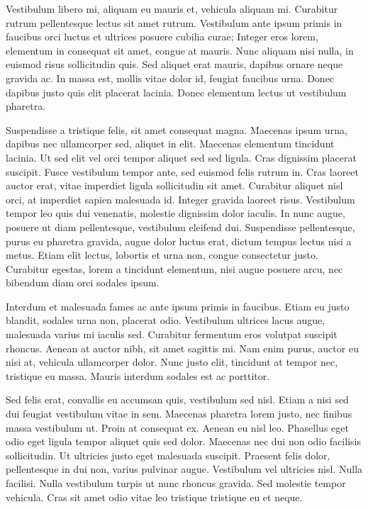 Vestibulum libero mi, aliquam eu mauris et, vehicula aliquam mi. Curabitur rutrum pellentesque lectus sit amet rutrum. Vestibulum ante ipsum primis in faucibus orci luctus et ultrices posuere cubilia curae; Integer eros lorem, elementum in consequat sit amet, congue at mauris. Nunc aliquam nisi nulla, in euismod risus sollicitudin quis. Sed aliquet erat mauris, dapibus ornare neque gravida ac. In massa est, mollis vitae dolor id, feugiat faucibus urna. Donec dapibus justo quis elit placerat lacinia. Donec elementum lectus ut vestibulum pharetra.

Suspendisse a tristique felis, sit amet consequat magna. Maecenas ipsum urna, dapibus nec ullamcorper sed, aliquet in elit. Maecenas elementum tincidunt lacinia. Ut sed elit vel orci tempor aliquet sed sed ligula. Cras dignissim placerat suscipit. Fusce vestibulum tempor ante, sed euismod felis rutrum in. Cras laoreet auctor erat, vitae imperdiet ligula sollicitudin sit amet. Curabitur aliquet nisl orci, at imperdiet sapien malesuada id. Integer gravida laoreet risus. Vestibulum tempor leo quis dui venenatis, molestie dignissim dolor iaculis. In nunc augue, posuere ut diam pellentesque, vestibulum eleifend dui. Suspendisse pellentesque, purus eu pharetra gravida, augue dolor luctus erat, dictum tempus lectus nisi a metus. Etiam elit lectus, lobortis et urna non, congue consectetur justo. Curabitur egestas, lorem a tincidunt elementum, nisi augue posuere arcu, nec bibendum diam orci sodales ipsum.

Interdum et malesuada fames ac ante ipsum primis in faucibus. Etiam eu justo blandit, sodales urna non, placerat odio. Vestibulum ultrices lacus augue, malesuada varius mi iaculis sed. Curabitur fermentum eros volutpat suscipit rhoncus. Aenean at auctor nibh, sit amet sagittis mi. Nam enim purus, auctor eu nisi at, vehicula ullamcorper dolor. Nunc justo elit, tincidunt at tempor nec, tristique eu massa. Mauris interdum sodales est ac porttitor.

Sed felis erat, convallis eu accumsan quis, vestibulum sed nisl. Etiam a nisi sed dui feugiat vestibulum vitae in sem. Maecenas pharetra lorem justo, nec finibus massa vestibulum ut. Proin at consequat ex. Aenean eu nisl leo. Phasellus eget odio eget ligula tempor aliquet quis sed dolor. Maecenas nec dui non odio facilisis sollicitudin. Ut ultricies justo eget malesuada suscipit. Praesent felis dolor, pellentesque in dui non, varius pulvinar augue. Vestibulum vel ultricies nisl. Nulla facilisi. Nulla vestibulum turpis ut nunc rhoncus gravida. Sed molestie tempor vehicula. Cras sit amet odio vitae leo tristique tristique eu et neque.

